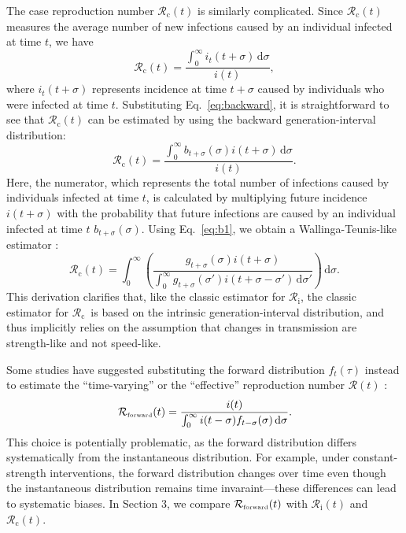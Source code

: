 \documentclass[12pt]{article}
\newcommand{\eref}[1]{Eq.~\ref{eq:#1}}
\newcommand{\Rx}[1]{\ensuremath{{\mathcal R}_{#1}}\xspace}
\newcommand{\Rc}{\Rx{\mathrm{c}}}
\newcommand{\Ri}{\Rx{\mathrm{i}}}
\newcommand{\RR}{\ensuremath{{\mathcal R}}\xspace}
\newcommand{\tsub}[2]{#1_{{\textrm{\tiny #2}}}}
\newcommand{\dd}[1]{\ensuremath{\, \mathrm{d}#1}}
\newcommand{\dsigma}{\dd{\sigma}}
\begin{document}
The case reproduction number $\Rc(t)$ is similarly complicated. 
Since $\Rc(t)$ measures the average number of new infections caused by an individual infected at time $t$, we have
\begin{equation}
\Rc(t) = \frac{\int_0^\infty i_t(t+\sigma) \dsigma}{i(t)},
\end{equation}
where $i_t(t+\sigma)$ represents incidence at time $t+\sigma$ caused by individuals who were infected at time $t$.
Substituting \eref{backward}, it is straightforward to see that $\Rc(t)$ can be estimated by using the backward generation-interval distribution:
\begin{equation}
\Rc(t) = \frac{\int_0^\infty b_{t+\sigma}(\sigma) i(t+\sigma) \dsigma}{i(t)}.
\end{equation}
Here, the numerator, which represents the total number of infections caused by individuals infected at time $t$, is calculated by multiplying future incidence $i(t+\sigma)$ with the probability that future infections are caused by an individual infected at time $t$ $b_{t+\sigma}(\sigma)$.
Using \eref{b1}, we obtain a Wallinga-Teunis-like estimator \citep{wallinga2004different}:
\begin{equation}
\Rc(t) = \int_0^\infty \left(\frac{g_{t+\sigma}(\sigma) i(t+\sigma)}{\int_0^\infty g_{t+\sigma}(\sigma') i(t+\sigma-\sigma') \dsigma'} \right) \dsigma.
\label{eq:wtlike}
\end{equation}
This derivation clarifies that, like the classic estimator for \Ri, the classic estimator for \Rc\ is based on the intrinsic generation-interval distribution, and thus implicitly relies on the assumption that changes in transmission are strength-like and not speed-like.

Some studies have suggested substituting the forward distribution $f_t(\tau)$ instead to estimate the ``time-varying'' or the ``effective'' reproduction number $\RR(t)$ \citep{liu2018measurability, ali2020serial}:
\begin{equation}
\tsub{\RR}{forward}(t) = \frac{i(t)}{\int_0^\infty i(t-\sigma) f_{t-\sigma}(\sigma) \dsigma}.
\end{equation}
This choice is potentially problematic, as the forward distribution differs systematically from the instantaneous distribution.
For example, under constant-strength interventions, the forward distribution changes over time even though the instantaneous distribution remains time invaraint---these differences can lead to systematic biases.
In Section 3, we compare $\tsub{\RR}{forward}(t)$ with $\Ri(t)$ and $\Rc(t)$.
\end{document}

